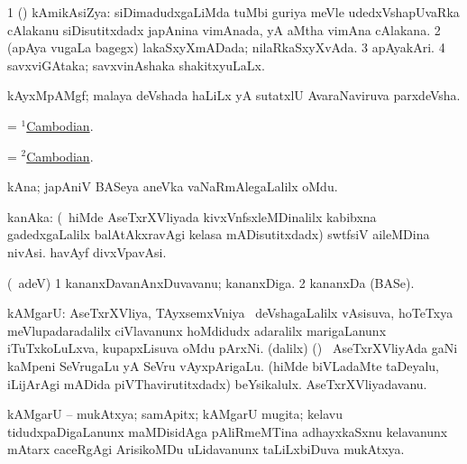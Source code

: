 \bentry
{}
\gl{\gu}
\bmng
\bnum
\num{1} (\ca) kAmikAsiZya: siDimadudxgaLiMda tuMbi guriya meVle udedxVshapUvaRka cAlakanu siDisutitxdadx japAnina vimAnada, yA aMtha vimAna cAlakana. 
\num{2} (apAya \mo vugaLa bagegx) lakaSxyXmADada; nilaRkaSxyXvAda. 
\num{3} apAyakAri. 
\num{4} savxviGAtaka; savxvinAshaka shakitxyuLaLx. 
\enum
\emng
\eentry

\bentry
{}
\gl{\nA}
\bmng
kAyxMpAMgf; malaya deVshada haLiLx yA sutatxlU AvaraNaviruva parxdeVsha. 
\emng
\eentry

\bentry
{}
\gl{\nA}
\bmng
= \hyperref{kandict_c.pdf}{C}{Cambodian(1)}{$^1$Cambodian}. 
\emng
\eentry

\bentry
{}
\gl{\gu}
\bmng
= \hyperref{kandict_c.pdf}{C}{Cambodian(2)}{$^2$Cambodian}. 
\emng
\eentry

\bentry
{}
\gl{\saMkiSx}
\bmng
{} 
\emng
\eentry

\bentry
{}
\gl{\nA}
\bmng
kAna; japAniV BASeya aneVka vaNaRmAlegaLalilx oMdu. 
\emng
\eentry

\bentry
{}
\gl{\nA}
\bmng
kanAka: 
\banum
{} (\kanmu\ hiMde AseTxrXVliyada kivxVnfsxleMDinalilx kabibxna gadedxgaLalilx balAtAkxravAgi kelasa mADisutitxdadx) swtfsiV aileMDina nivAsi. 
 havAyf divxVpavAsi. 
\eanum
\emng
\eentry

\bentry
{}
\gl{\nA}
\bmng
(\bava\ adeV) 
\bnum
\num{1} kananxDavanAnxDuvavanu; kananxDiga. 
\num{2} kananxDa (BASe). 
\enum
\emng
\eentry

\bentry
{}
\gl{\nA}
\bmng
kAMgarU: 
\banum
{} AseTxrXVliya, TAyxsemxVniya \mo\ deVshagaLalilx vAsisuva, hoTeTxya meVlupadaradalilx ciVlavanunx hoMdidudx adaralilx marigaLanunx iTuTxkoLuLxva, kupapxLisuva oMdu pArxNi.   
 (\bava dalilx) (\ashi) \pa\ AseTxrXVliyAda gaNi kaMpeni SeVrugaLu yA SeVru vAyxpArigaLu. 
 (hiMde biVLadaMte taDeyalu, iLijArAgi mADida piVThavirutitxdadx) beYsikalulx. 
 AseTxrXVliyadavanu. 
\eanum
\emng
\eentry

\bentry
{}
\gl{\nA}
\bmng
kAMgarU -- mukAtxya; samApitx; kAMgarU mugita; kelavu tidudxpaDigaLanunx maMDisidAga pAliRmeMTina adhayxkaSxnu kelavanunx mAtarx caceRgAgi ArisikoMDu uLidavanunx taLiLxbiDuva mukAtxya. 
\emng
\eentry

